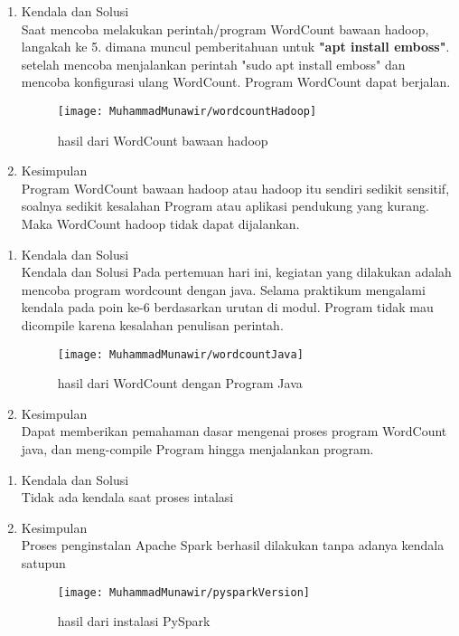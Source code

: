 \begin{enumerate}
\item Kendala dan Solusi \\
Saat mencoba melakukan perintah/program WordCount bawaan hadoop, langakah ke 5. dimana muncul pemberitahuan untuk \textbf{"apt install emboss"}. setelah mencoba menjalankan perintah "sudo apt install emboss" dan mencoba konfigurasi ulang WordCount. Program WordCount dapat berjalan.

\begin{figure}[!ht]
\texttt{[image: MuhammadMunawir/wordcountHadoop]}
\caption{hasil dari WordCount bawaan hadoop}
\end{figure}

\item Kesimpulan \\
Program WordCount bawaan hadoop atau hadoop itu sendiri sedikit sensitif, soalnya sedikit kesalahan Program atau aplikasi pendukung yang kurang. Maka WordCount hadoop tidak dapat dijalankan.
\end{enumerate}

\begin{enumerate}
\item Kendala dan Solusi \\
Kendala dan Solusi Pada pertemuan hari ini, kegiatan yang dilakukan adalah mencoba program wordcount dengan java. Selama praktikum mengalami kendala pada poin ke-6 berdasarkan urutan di modul. Program tidak mau dicompile karena kesalahan penulisan perintah.

\begin{figure}[!ht]
\texttt{[image: MuhammadMunawir/wordcountJava]}
\caption{hasil dari WordCount dengan Program Java}
\end{figure}

\item Kesimpulan \\
Dapat memberikan pemahaman dasar mengenai proses program WordCount java, dan meng-compile Program hingga menjalankan program.
\end{enumerate}

\begin{enumerate}
\item Kendala dan Solusi \\
Tidak ada kendala saat proses intalasi

\item Kesimpulan \\
Proses penginstalan Apache Spark berhasil dilakukan tanpa
adanya kendala satupun

\begin{figure}[!ht]
\texttt{[image: MuhammadMunawir/pysparkVersion]}
\caption{hasil dari instalasi PySpark}
\end{figure}

\end{enumerate}